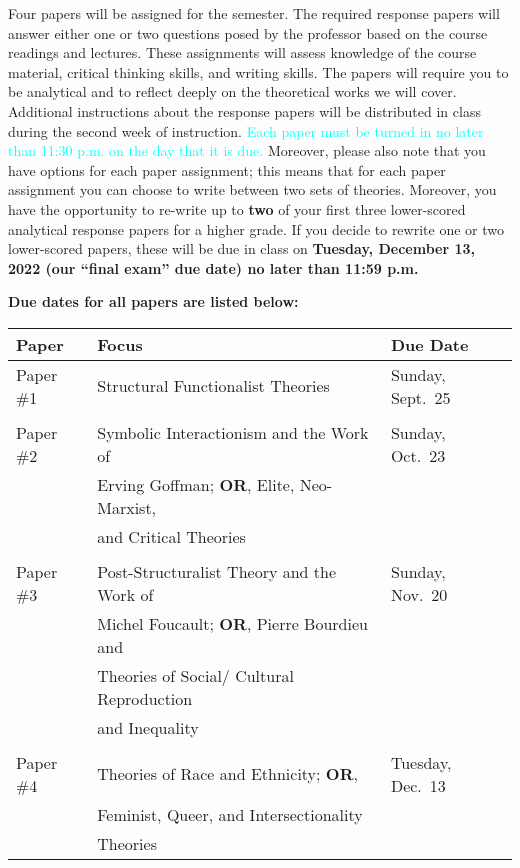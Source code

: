 \documentclass[11pt,]{article}
\begin{document}
Four papers will be assigned for the semester. The required response
papers will answer either one or two questions posed by the professor
based on the course readings and lectures. These assignments will assess
knowledge of the course material, critical thinking skills, and writing
skills. The papers will require you to be analytical and to reflect
deeply on the theoretical works we will cover. Additional instructions
about the response papers will be distributed in class during the second
week of instruction.
\textcolor{cyan}{Each paper must be turned in no later than 11:30 p.m. on the day that it is due.}
Moreover, please also note that you have options for each paper
assignment; this means that for each paper assignment you can choose to
write between two sets of theories. Moreover, you have the opportunity
to re-write up to \textbf{two} of your first three lower-scored
analytical response papers for a higher grade. If you decide to rewrite
one or two lower-scored papers, these will be due in class on
\textbf{Tuesday, December 13, 2022 (our ``final exam'' due date) no
later than 11:59 p.m.}

\textbf{Due dates for all papers are listed below:}

\renewcommand{\arraystretch}{1.15}

\begin{longtable}[]{@{}lll@{}}
\toprule
\textbf{Paper} & \textbf{Focus} & \textbf{Due Date} \\
\midrule
\endhead
Paper \#1 & Structural Functionalist Theories & Sunday, Sept.~25 \\
& & \\
Paper \#2 & Symbolic Interactionism and the Work of & Sunday, Oct.~23 \\
& Erving Goffman; \textbf{OR}, Elite, Neo-Marxist, & \\
& and Critical Theories & \\
& & \\
Paper \#3 & Post-Structuralist Theory and the Work of & Sunday,
Nov.~20 \\
& Michel Foucault; \textbf{OR}, Pierre Bourdieu and & \\
& Theories of Social/ Cultural Reproduction & \\
& and Inequality & \\
& & \\
Paper \#4 & Theories of Race and Ethnicity; \textbf{OR}, & Tuesday,
Dec.~13 \\
& Feminist, Queer, and Intersectionality & \\
& Theories & \\
\bottomrule
\end{longtable}
\end{document}
